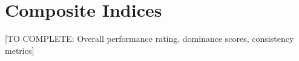 \section{Composite Indices}

[TO COMPLETE: Overall performance rating, dominance scores, consistency metrics]